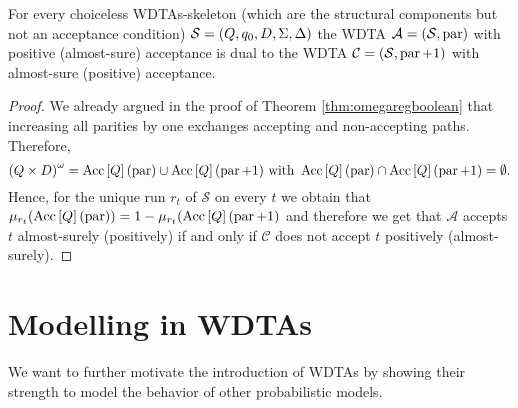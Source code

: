 \begin{proposition}
  For every choiceless \acp{WDTA}-skeleton (which are the structural components
  but not an acceptance condition) 
  $\mathcal{S} = \left(Q, q_{0}, D, \Sigma, \Delta\right)$ the
  \ac{WDTA} $\mathcal{A} = \left(\mathcal{S}, \operatorname{par}\right)$ with positive
  (almost-sure) acceptance is dual to the \ac{WDTA}
  $\mathcal{C} = \left(\mathcal{S}, \operatorname{par} + 1\right)$ with almost-sure (positive)
  acceptance.
\end{proposition}
\begin{proof}
  We already argued in the proof of Theorem \ref{thm:omegaregboolean} that
  increasing all parities by one exchanges accepting and non-accepting paths.
  Therefore,
  \begin{equation*}
    \left(Q\times D\right)^{\omega} = 
      \operatorname{Acc}\left[Q\right](\operatorname{par})\cup\operatorname{Acc}\left[Q\right](\operatorname{par} + 1)
    \text{ with }
      \operatorname{Acc}\left[Q\right](\operatorname{par})\cap\operatorname{Acc}\left[Q\right](\operatorname{par} + 1) = \emptyset.
  \end{equation*}
  Hence, for the unique run $r_{t}$ of $\mathcal{S}$ on every $t$ we obtain
  that $\mu_{r_{t}}(\operatorname{Acc}\left[Q\right](\operatorname{par})) =
    1 - \mu_{r_{t}}(\operatorname{Acc}\left[Q\right](\operatorname{par} + 1)$ and therefore we get that
  $\mathcal{A}$ accepts $t$ almost-surely (positively) if and only if
  $\mathcal{C}$ does not accept $t$ positively (almost-surely).
\end{proof}

\section{Modelling in \aclp{WDTA}}
We want to further motivate the introduction of \acp{WDTA} by showing their
strength to model the behavior of other probabilistic models.
